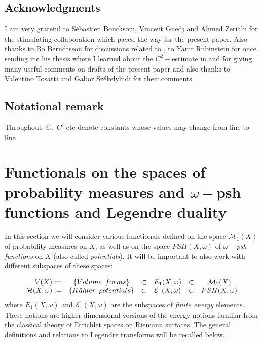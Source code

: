 \documentclass[11pt,oneside,english]{amsart}
\numberwithin{equation}{section}
\numberwithin{figure}{section}
\theoremstyle{plain}
\theoremstyle{plain}
\theoremstyle{plain}
\theoremstyle{plain}
\theoremstyle{remark}
\theoremstyle{definition}
\begin{document}
\subsection*{Acknowledgments}

I am very grateful to Sébastien Boucksom, Vincent Guedj and Ahmed
Zeriahi for the stimulating collaboration \cite{bbgz} which paved
the way for the present paper. Also thanks to Bo Berndtsson for discussions
related to \cite{bern}, to Yanir Rubinstein for once sending me his
thesis where I learned about the $C^{2}-$estimate in \cite{b-k,rub1}
and for giving many useful comments on drafts of the present paper
and also thanks to Valentino Tosatti and Gabor Székelyhidi for their
comments.

\subsection*{Notational remark}

Throughout, $C,$ $C'$ etc denote constants whose values may change
from line to line

\section{\label{sec:Functionals-on-the}Functionals on the spaces of probability
measures and $\omega-$psh functions and Legendre duality}

In this section we will consider various functionals defined on the
space $\mathcal{M}_{1}(X)$ of probability measures on $X$, as well
as on the space $PSH(X,\omega)$ of \emph{$\omega-$psh functions}
on $X$ (also called \emph{potentials}). It will be important to also
work with different subspaces of these spaces:

\[
\begin{array}{rccccc}
V(X):= & \mbox{\ensuremath{\left\{ Volume\,\ forms\right\} }} & \subset & E_{1}(X,\omega) & \subset & \mathcal{M}_{1}(X)\\
\mathcal{H}(X,\omega):= & \mbox{\ensuremath{\left\{ K\ddot{a}hler\,\ potentials\right\} }} & \subset & \mathcal{E}^{1}(X,\omega) & \subset & PSH(X,\omega)
\end{array}
\]
 where $E_{1}(X,\omega)$ and $\mathcal{E}^{1}(X,\omega)$ are the
subspaces of \emph{finite energy} elements. These notions are higher
dimensional versions of the energy notions familiar from the classical
theory of Dirichlet spaces on Riemann surfaces. The general definitions
and relations to Legendre transforms will be recalled below. 
\end{document}
